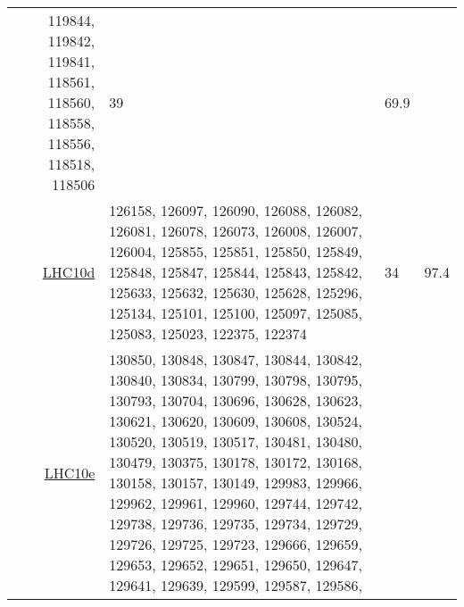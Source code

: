\begin{table}[h]
\begin{tabularx}{\textwidth}{r|Xll}
                                119844, 119842, 119841, 118561, 118560, 118558, 118556, 118518, 118506				&39				&69.9							\\
\href{https://alimonitor.cern.ch/configuration/index.jsp?partition=LHC10d\&pass=4\&s=\&raw_run=\&filling_scheme=\&filling_config=\&fillno=\&energy=\&intensity_per_bunch=\&mu=\&interacting_bunches=\&noninteracting_bunches_beam_1=\&noninteracting_bunches_beam_2=\&interaction_trigger=\&rate=\&beam_empty_trigger=\&empty_empty_trigger=\&muon_trigger=\&high_multiplicity_trigger=\&emcal_trigger=\&calibration_trigger=\&quality=1\&muon_quality=\&physics_selection_status=\&comment=\&field=\&det_aco=\&det_ad0=\&det_emc=\&det_fmd=\&det_hlt=\&det_hmp=\&det_mch=\&det_mtr=\&det_phs=\&det_pmd=\&det_spd=\&det_sdd=\&det_ssd=\&det_tof=X\&det_tpc=X\&det_trd=\&det_t00=X\&det_v00=X\&det_zdc=\&hlt_mode=\&changedon=}{LHC10d}		&126158, 126097, 126090, 126088, 126082, 126081, 126078, 126073, 126008, 126007,
                                126004, 125855, 125851, 125850, 125849, 125848, 125847, 125844, 125843, 125842,
                                125633, 125632, 125630, 125628, 125296, 125134, 125101, 125100, 125097, 125085,
                                125083, 125023, 122375, 122374 				&34				&97.4								\\
\href{https://alimonitor.cern.ch/configuration/index.jsp?partition=LHC10e\&pass=4\&s=\&raw_run=\&filling_scheme=\&filling_config=\&fillno=\&energy=\&intensity_per_bunch=\&mu=\&interacting_bunches=\&noninteracting_bunches_beam_1=\&noninteracting_bunches_beam_2=\&interaction_trigger=\&rate=\&beam_empty_trigger=\&empty_empty_trigger=\&muon_trigger=\&high_multiplicity_trigger=\&emcal_trigger=\&calibration_trigger=\&quality=1\&muon_quality=\&physics_selection_status=\&comment=\&field=\&det_aco=\&det_ad0=\&det_emc=\&det_fmd=\&det_hlt=\&det_hmp=\&det_mch=\&det_mtr=\&det_phs=\&det_pmd=\&det_spd=\&det_sdd=\&det_ssd=\&det_tof=X\&det_tpc=X\&det_trd=\&det_t00=X\&det_v00=X\&det_zdc=\&hlt_mode=\&changedon=}{LHC10e}		&130850, 130848, 130847, 130844, 130842, 130840, 130834, 130799, 130798, 130795,
                                130793, 130704, 130696, 130628, 130623, 130621, 130620, 130609, 130608, 130524,
                                130520, 130519, 130517, 130481, 130480, 130479, 130375, 130178, 130172, 130168,
                                130158, 130157, 130149, 129983, 129966, 129962, 129961, 129960, 129744, 129742,
                                129738, 129736, 129735, 129734, 129729, 129726, 129725, 129723, 129666, 129659,
                                129653, 129652, 129651, 129650, 129647, 129641, 129639, 129599, 129587, 129586,

\end{tabularx}
\end{table}
